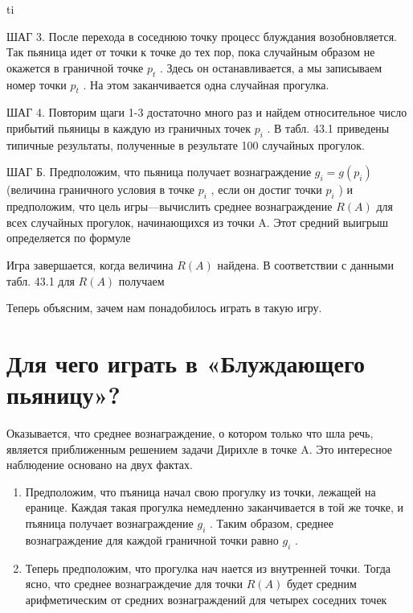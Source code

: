 \documentclass[
  ukrainian,
]{article}
\begin{document}
ti

ШАГ 3. После перехода в соседнюю точку процесс блуждания возобновляется.
Так пьяница идет от точки к точке до тех пор, пока случайным образом не
окажется в граничной точке \(p_t\) . Здесь он останавливается, а мы
записываем номер точки \(p_t\) . На этом заканчивается одна случайная
прогулка.

ШАГ 4. Повторим щаги 1-3 достаточно много раз и найдем относительное
число прибытий пьяницы в каждую из граничных точек \(p_i\) . В табл.
43.1 приведены типичные результаты, полученные в результате 100
случайных прогулок.

ШАГ Б. Предположим, что пьяница получает вознаграждение
\(g_i = g\left(p_i\right)\) (величина граничного условия в точке \(p_i\)
, если он достиг точки \(p_i\) ) и предположим, что цель
игры---вычислить среднее вознаграждение \(R\left(A\right)\) для всех
случайных прогулок, начинающихся из точки A. Этот средний выигрыш
определяется по формуле

Игра завершается, когда величина \(R\left(A\right)\) найдена. В
соответствии с данными табл. 43.1 для \(R\left(A\right)\) получаем

Теперь объясним, зачем нам понадобилось играть в такую игру.

\section{Для чего играть в «Блуждающего
пьяницу»?}\label{ux434ux43bux44f-ux447ux435ux433ux43e-ux438ux433ux440ux430ux442ux44c-ux432-ux431ux43bux443ux436ux434ux430ux44eux449ux435ux433ux43e-ux43fux44cux44fux43dux438ux446ux443}

Оказывается, что среднее вознаграждение, о котором только что шла речь,
является приближенным решением задачи Дирихле в точке A. Это интересное
наблюдение основано на двух фактах.

\begin{enumerate}
\def\labelenumi{\arabic{enumi}.}
\item
  Предположим, что пъяница начал свою прогулку из точки, лежащей на
  еранице. Каждая такая прогулка немедленно заканчивается в той же
  точке, и пъяница получает вознаграждение \(g_i\) . Таким образом,
  среднее вознаграждение для каждой граничной точки равно \(g_i\) .
\item
  Теперь предположим, что прогулка нач нается из внутренней точки. Тогда
  ясно, что среднее вознаграждечие для точки \(R(A)\) будет средним
  арифметическим от средних вознаграждений для четырех соседних точек
\end{enumerate}
\end{document}

